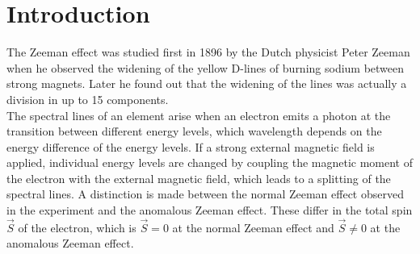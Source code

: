 \section{Introduction}
The Zeeman effect was studied first in 1896 by the Dutch physicist Peter Zeeman when he observed the widening of the yellow D-lines of burning sodium between strong magnets.
Later he found out that the widening of the lines was actually a division in up to 15 components.\\
The spectral lines of an element arise when an electron emits a photon at the transition between different energy levels, which wavelength depends on the energy difference of the energy levels.
If a strong external magnetic field is applied, individual energy levels are changed by coupling the magnetic moment of the electron with the external magnetic field, which leads to a splitting of the spectral lines.
A distinction is made between the normal Zeeman effect observed in the experiment and the anomalous Zeeman effect.
These differ in the total spin $\vec{S}$ of the electron, which is $\vec{S} = 0$ at the normal Zeeman effect and $\vec{S}\neq 0$ at the anomalous Zeeman effect.